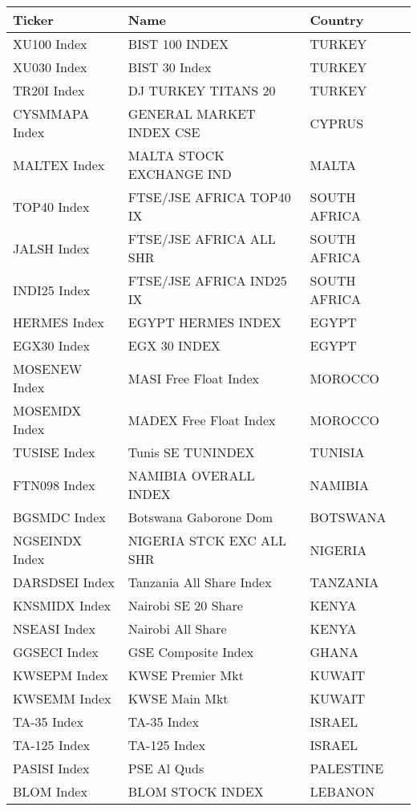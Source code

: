 \begin {table}[H]
\begin{center}
\small
\hspace*{-3cm}
\begin{tabu}{| l l l |} 
\hline
Ticker & Name & Country\\
\hline
XU100 Index & BIST 100 INDEX & TURKEY \\ 
XU030 Index & BIST 30 Index & TURKEY \\ 
TR20I Index & DJ TURKEY TITANS 20 & TURKEY \\ 
CYSMMAPA Index & GENERAL MARKET INDEX CSE & CYPRUS \\ 
MALTEX Index & MALTA STOCK EXCHANGE IND & MALTA \\ 
TOP40 Index & FTSE/JSE AFRICA TOP40 IX & SOUTH AFRICA \\ 
JALSH Index & FTSE/JSE AFRICA ALL SHR & SOUTH AFRICA \\ 
INDI25 Index & FTSE/JSE AFRICA IND25 IX & SOUTH AFRICA \\ 
HERMES Index & EGYPT HERMES INDEX & EGYPT \\ 
EGX30 Index & EGX 30 INDEX & EGYPT \\ 
MOSENEW Index & MASI Free Float Index & MOROCCO \\ 
MOSEMDX Index & MADEX Free Float Index & MOROCCO \\ 
TUSISE Index & Tunis SE TUNINDEX & TUNISIA \\ 
FTN098 Index & NAMIBIA OVERALL INDEX & NAMIBIA \\ 
BGSMDC Index & Botswana Gaborone Dom & BOTSWANA \\ 
NGSEINDX Index & NIGERIA STCK EXC ALL SHR & NIGERIA \\ 
DARSDSEI Index & Tanzania All Share Index & TANZANIA \\ 
KNSMIDX Index & Nairobi SE 20 Share & KENYA \\ 
NSEASI Index & Nairobi All Share & KENYA \\ 
GGSECI Index & GSE Composite Index & GHANA \\ 
KWSEPM Index & KWSE Premier Mkt & KUWAIT \\ 
KWSEMM Index & KWSE Main Mkt & KUWAIT \\ 
TA-35 Index & TA-35 Index & ISRAEL \\ 
TA-125 Index & TA-125 Index & ISRAEL \\ 
PASISI Index & PSE Al Quds & PALESTINE \\ 
BLOM Index & BLOM STOCK INDEX & LEBANON \\ 

\end{tabu}
\end{center}
\end{table}

